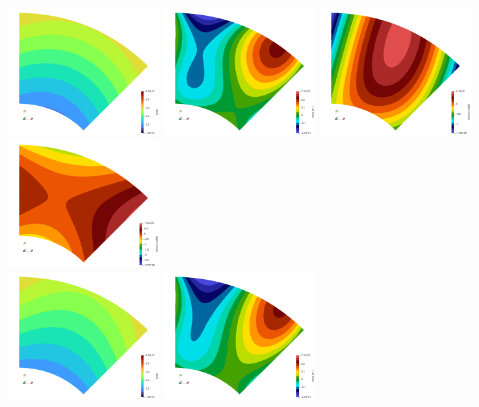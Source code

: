 \begin{center}
\includegraphics[width=4cm]{images/mappings/biquadratic3/elt4/jcob.0003.png}
\includegraphics[width=4cm]{images/mappings/biquadratic3/elt4/f.0003.png}
\includegraphics[width=4cm]{images/mappings/biquadratic3/elt4/dfdx.0003.png}
\includegraphics[width=4cm]{images/mappings/biquadratic3/elt4/dfdy.0003.png}\\
\includegraphics[width=4cm]{images/mappings/biquadratic3/elt4/jcob.0004.png}
\includegraphics[width=4cm]{images/mappings/biquadratic3/elt4/f.0004.png}

\end{center}
